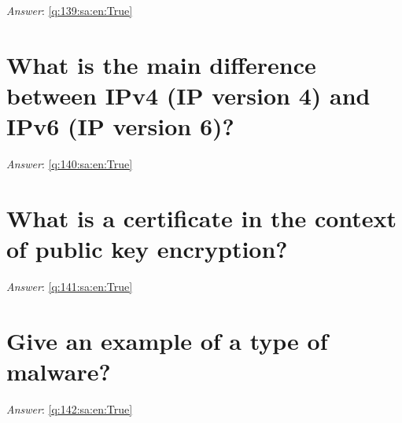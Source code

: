 \documentclass[a4paper,11pt,oneside]{book}
\begin{document}
\begin{sloppypar}
\label{q:139:sa:en:False}

\vspace{2cm}

\noindent\makebox[\textwidth]{\hrulefill}

\vspace{1cm}

\textit{Answer}: \autoref{q:139:sa:en:True}



\section{What is the main difference between IPv4 (IP version 4) and IPv6 (IP version 6)?}

\label{q:140:sa:en:False}

\vspace{2cm}

\noindent\makebox[\textwidth]{\hrulefill}

\vspace{1cm}

\textit{Answer}: \autoref{q:140:sa:en:True}



\section{What is a certificate in the context of public key encryption?}

\label{q:141:sa:en:False}

\vspace{2cm}

\noindent\makebox[\textwidth]{\hrulefill}

\vspace{1cm}

\textit{Answer}: \autoref{q:141:sa:en:True}



\section{Give an example of a type of malware?}

\label{q:142:sa:en:False}

\vspace{2cm}

\noindent\makebox[\textwidth]{\hrulefill}

\vspace{1cm}

\textit{Answer}: \autoref{q:142:sa:en:True}




\end{sloppypar}
\end{document}
